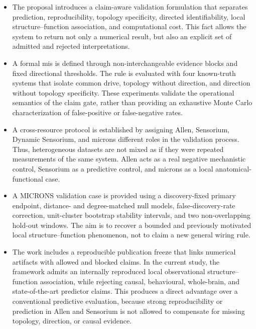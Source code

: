 \documentclass[a4paper,fleqn]{cas-sc}
\begin{document}
\begin{itemize}
  \item The proposal introduces a claim-aware validation formulation that
  separates prediction, reproducibility, topology specificity, directed
  identifiability, local structure--function association, and computational
  cost. This fact allows the system to return not only a numerical result, but
  also an explicit set of admitted and rejected interpretations.

  \item A formal \acs{mis} is defined through non-interchangeable evidence
  blocks and fixed directional thresholds. The rule is evaluated with four
  known-truth systems that isolate common drive, topology without direction, and
  direction without topology specificity. These experiments validate the
  operational semantics of the claim gate, rather than providing an exhaustive
  Monte Carlo characterization of false-positive or false-negative rates.

  \item A cross-resource protocol is established by assigning Allen,
  Sensorium, Dynamic Sensorium, and \acs{microns} different roles in the
  validation process. Thus, heterogeneous datasets are not mixed as if they were
  repeated measurements of the same system. Allen acts as a real negative
  mechanistic control, Sensorium as a predictive control, and \acs{microns} as a
  local anatomical-functional case.

  \item A MICRONS validation case is provided using a discovery-fixed primary
  endpoint, distance- and degree-matched null models, false-discovery-rate
  correction, unit-cluster bootstrap stability intervals, and two non-overlapping hold-out
  windows. The aim is to recover a bounded and previously motivated local
  structure--function phenomenon, not to claim a new general wiring rule.

  \item The work includes a reproducible publication freeze that links numerical
  artifacts with allowed and blocked claims. In the current study, the framework
  admits an internally reproduced local observational structure--function association, while
  rejecting causal, behavioural, whole-brain, and state-of-the-art predictor
  claims. This produces a direct advantage over a conventional predictive
  evaluation, because strong reproducibility or prediction in Allen and Sensorium
  is not allowed to compensate for missing topology, direction, or causal
  evidence.
\end{itemize}
\end{document}
